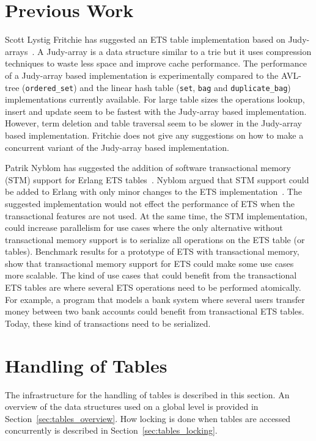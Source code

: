 \documentclass[aps,pre,preprint,nofootinbib]{revtex4}
\begin{document}
\section{Previous Work}

Scott Lystig Fritchie has suggested an ETS table implementation based on Judy-arrays~\cite{ScottEtsJudy}.
A Judy-array is a data structure similar to a trie but it uses compression techniques to waste less space and improve cache performance.
The performance of a Judy-array based implementation is experimentally compared to the AVL-tree (\verb|ordered_set|) and the linear hash table (\verb|set|, \verb|bag| and \verb|duplicate_bag|) implementations currently available.
For large table sizes the operations lookup, insert and update seem to be fastest with the Judy-array based implementation.
However, term deletion and table traversal seem to be slower in the Judy-array based implementation.
Fritchie does not give any suggestions on how to make a concurrent variant of the Judy-array based implementation.

Patrik Nyblom has suggested the addition of software transactional memory (STM) support for Erlang ETS tables~\cite{PatrikErlangTrans}.
Nyblom argued that STM support could be added to Erlang with only minor changes to the ETS implementation~\cite{PatrikErlangTrans}.
The suggested implementation would not effect the performance of ETS when the transactional features are not used.
At the same time, the  STM implementation, could increase parallelism for use cases where the only alternative without transactional memory support is to serialize all operations on the ETS table (or tables).
Benchmark results for a prototype of ETS with transactional memory, show that transactional memory support for ETS could make some use cases more scalable.
The kind of use cases that could benefit from the transactional ETS tables are where several ETS operations need to be performed atomically.
For example, a program that models a bank system where several users transfer money between two bank accounts could benefit from transactional ETS tables. Today, these kind of transactions need to be serialized.

\section{Handling of Tables}

The infrastructure for the handling of tables is described in this section.
An overview of the data structures used on a global level is provided in Section~\ref{sec:tables_overview}.
How locking is done when tables are accessed concurrently is described in Section~\ref{sec:tables_locking}.
\end{document}
